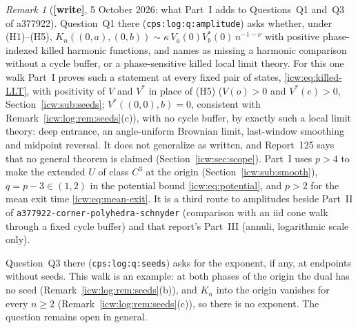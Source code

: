 \documentclass[11pt,letterpaper]{article}
\theoremstyle{remark}\newtheorem{remark}[theorem]{Remark}
\newcommand{\1}{\mathbf1}
\newcommand{\wtag}{\textup{\textbf{[write]}}}
\newcommand{\file}[1]{\textup{\nolinkurl{#1}}}
\begin{document}
\begin{remark}[\wtag, 5 October 2026: what Part~I adds to Questions~Q1 and~Q3 of a377922]\label{icw:log:rem:amplitude}
Question~Q1 there (\texttt{cps:log:q:amplitude}) asks whether, under (H1)--(H5), $K_n((0,a),(0,b))\sim\kappa\,V_a(0)V^*_b(0)\,n^{-1-\nu}$ with positive phase-indexed killed harmonic functions, and names as missing a harmonic comparison without a cycle buffer, or a phase-sensitive killed local limit theory. For this one walk Part~I proves such a statement at every fixed pair of states, \eqref{icw:eq:killed-LLT}, with positivity of $V$ and $V^*$ in place of (H5) ($V(o)>0$ and $V^*(e)>0$, Section~\ref{icw:sub:seeds}; $V^*((0,0),b)=0$, consistent with Remark~\ref{icw:log:rem:seeds}(c)), with no cycle buffer, by exactly such a local limit theory: deep entrance, an angle-uniform Brownian limit, last-window smoothing and midpoint reversal. It does not generalize as written, and Report~125 says that no general theorem is claimed (Section~\ref{icw:sec:scope}). Part~I uses $p>4$ to make the extended $U$ of class $C^3$ at the origin (Section~\ref{icw:sub:smooth}), $q=p-3\in(1,2)$ in the potential bound \eqref{icw:eq:potential}, and $p>2$ for the mean exit time \eqref{icw:eq:mean-exit}. It is a third route to amplitudes beside Part~II of \file{a377922-corner-polyhedra-schnyder} (comparison with an iid cone walk through a fixed cycle buffer) and that report's Part~III (annuli, logarithmic scale only).

Question~Q3 there (\texttt{cps:log:q:seeds}) asks for the exponent, if any, at endpoints without seeds. This walk is an example: at both phases of the origin the dual has no seed (Remark~\ref{icw:log:rem:seeds}(b)), and $K_n$ into the origin vanishes for every $n\ge2$ (Remark~\ref{icw:log:rem:seeds}(c)), so there is no exponent. The question remains open in general.
\end{remark}
\end{document}
